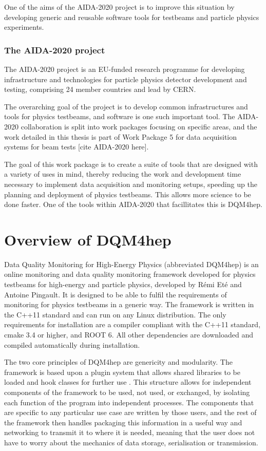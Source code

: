 One of the aims of the AIDA-2020 project is to improve this situation by developing generic and reusable software tools for testbeams and particle physics experiments.

\subsubsection{The AIDA-2020 project}
The AIDA-2020 project is an EU-funded research programme for developing infrastructure and technologies for particle physics detector development and testing, comprising 24 member countries and lead by CERN.

The overarching goal of the project is to develop common infrastructures and tools for physics testbeams, and software is one such important tool. The AIDA-2020 collaboration is split into work packages focusing on specific areas, and the work detailed in this thesis is part of Work Package 5 for data acquisition systems for beam tests [cite AIDA-2020 here]. 

The goal of this work package is to create a suite of tools that are designed with a variety of uses in mind, thereby reducing the work and development time necessary to implement data acquisition and monitoring setups, speeding up the planning and deployment of physics testbeams. This allows more science to be done faster. One of the tools within AIDA-2020 that facillitates this is DQM4hep.

\section{Overview of DQM4hep}
Data Quality Monitoring for High-Energy Physics (abbreviated DQM4hep) is an online monitoring and data quality monitoring framework developed for physics testbeams for high-energy and particle physics, developed by R\'{e}mi Et\'{e} and Antoine Pingault. It is designed to be able to fulfil the requirements of monitoring for physics testbeams in a generic way. The framework is written in the C++11 standard and can run on any Linux distribution. The only requirements for installation are a compiler compliant with the C++11 standard, cmake 3.4 or higher, and ROOT 6. All other dependencies are downloaded and compiled automatically during installation. 

The two core principles of DQM4hep are genericity and modularity. The framework is based upon a plugin system that allows shared libraries to be loaded and hook classes for further use \cite{aida2020-milestone-dqm4hep}. This structure allows for independent components of the framework to be used, not used, or exchanged, by isolating each function of the program into independent processes. The components that are specific to any particular use case are written by those users, and the rest of the framework then handles packaging this information in a useful way and networking to transmit it to where it is needed, meaning that the user does not have to worry about the mechanics of data storage, serialisation or transmission. 

